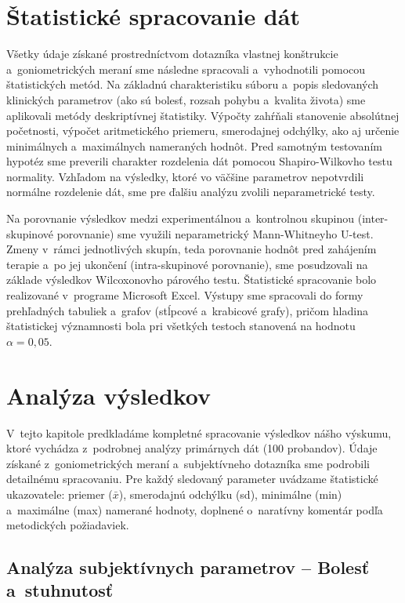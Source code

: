 \section{Štatistické spracovanie dát}

Všetky údaje získané prostredníctvom dotazníka vlastnej konštrukcie a~goniometrických meraní sme následne spracovali a~vyhodnotili pomocou štatistických metód. Na základnú charakteristiku súboru a~popis sledovaných klinických parametrov (ako sú bolesť, rozsah pohybu a~kvalita života) sme aplikovali metódy deskriptívnej štatistiky. Výpočty zahŕňali stanovenie absolútnej početnosti, výpočet aritmetického priemeru, smerodajnej odchýlky, ako aj určenie minimálnych a~maximálnych nameraných hodnôt. Pred samotným testovaním hypotéz sme preverili charakter rozdelenia dát pomocou Shapiro-Wilkovho testu normality. Vzhľadom na výsledky, ktoré vo väčšine parametrov nepotvrdili normálne rozdelenie dát, sme pre ďalšiu analýzu zvolili neparametrické testy.

Na porovnanie výsledkov medzi experimentálnou a~kontrolnou skupinou (inter-skupinové porovnanie) sme využili neparametrický Mann-Whitneyho U-test. Zmeny v~rámci jednotlivých skupín, teda porovnanie hodnôt pred zahájením terapie a~po jej ukončení (intra-skupinové porovnanie), sme posudzovali na základe výsledkov Wilcoxonovho párového testu. Štatistické spracovanie bolo realizované v~programe Microsoft Excel. Výstupy sme spracovali do formy prehľadných tabuliek a~grafov (stĺpcové a~krabicové grafy), pričom hladina štatistickej významnosti bola pri všetkých testoch stanovená na hodnotu $\alpha = 0,05$.

\section{Analýza výsledkov}

V~tejto kapitole predkladáme kompletné spracovanie výsledkov nášho výskumu, ktoré vychádza z~podrobnej analýzy primárnych dát (100 probandov). Údaje získané z~goniometrických meraní a~subjektívneho dotazníka sme podrobili detailnému spracovaniu. Pre každý sledovaný parameter uvádzame štatistické ukazovatele: priemer ($\bar{x}$), smerodajnú odchýlku (sd), minimálne (min) a~maximálne (max) namerané hodnoty, doplnené o~naratívny komentár podľa metodických požiadaviek.

\subsection{Analýza subjektívnych parametrov – Bolesť a~stuhnutosť}

